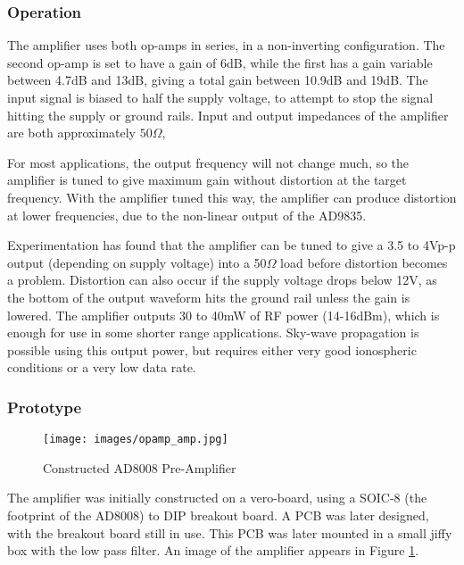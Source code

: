 \documentclass[a4paper,12pt]{article}
\begin{document}
\subsubsection*{Operation}

The amplifier uses both op-amps in series, in a non-inverting configuration. The second op-amp is set to have a gain of 6dB, while the first has a gain variable between 4.7dB and 13dB, giving a total gain between 10.9dB and 19dB. The input signal is biased to half the supply voltage, to attempt to stop the signal hitting the supply or ground rails. Input and output impedances of the amplifier are both approximately $50\Omega$, 

For most applications, the output frequency will not change much, so the amplifier is tuned to give maximum gain without distortion at the target frequency. With the amplifier tuned this way, the amplifier can produce distortion at lower frequencies, due to the non-linear output of the AD9835. 

Experimentation has found that the amplifier can be tuned to give a 3.5 to 4Vp-p output (depending on supply voltage) into a 50$\Omega$ load before distortion becomes a problem. Distortion can also occur if the supply voltage drops below 12V, as the bottom of the output waveform hits the ground rail unless the gain is lowered. The amplifier outputs 30 to 40mW of RF power (14-16dBm), which is enough for use in some shorter range applications. Sky-wave propagation is possible using this output power, but requires either very good ionospheric conditions or a very low data rate. 

\subsubsection*{Prototype}
\begin{figure}[h]
  \begin{center}
    \texttt{[image: images/opamp\_amp.jpg]}
  \end{center}
  \caption{Constructed AD8008 Pre-Amplifier}
  \label{fig:ad8008}
\end{figure}

The amplifier was initially constructed on a vero-board, using a SOIC-8 (the footprint of the AD8008) to DIP breakout board. A PCB was later designed, with the breakout board still in use. This PCB was later mounted in a small jiffy box with the low pass filter. An image of the amplifier appears in Figure \ref{fig:ad8008}.
\end{document}
